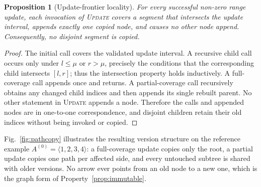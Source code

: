 \documentclass[conference]{IEEEtran}
\newtheorem{proposition}{Proposition}
\begin{document}
\begin{proposition}[Update-frontier locality]
\label{prop:frontier}
For every successful non-zero range update, each invocation of \textsc{Update} covers a segment
that intersects the update interval, appends exactly one copied node, and causes no other node
append. Consequently, no disjoint segment is copied.
\end{proposition}

\begin{proof}
The initial call covers the validated update interval. A recursive child call occurs only under
$l\leq\mu$ or $r>\mu$, precisely the conditions that the corresponding child intersects
$[l,r]$; thus the intersection property holds inductively. A full-coverage call appends once and
returns. A partial-coverage call recursively obtains any changed child indices and then appends
its single rebuilt parent. No other statement in \textsc{Update} appends a node. Therefore the
calls and appended nodes are in one-to-one correspondence, and disjoint children retain their old
indices without being invoked or copied.
\end{proof}

Fig.~\ref{fig:pathcopy} illustrates the resulting version structure on the reference example
$A^{(0)} = \langle 1, 2, 3, 4 \rangle$: a full-coverage update copies only the root, a partial
update copies one path per affected side, and every untouched subtree is shared with older
versions. No arrow ever points from an old node to a new one, which is the graph form of
Property~\ref{prop:immutable}.
\end{document}

